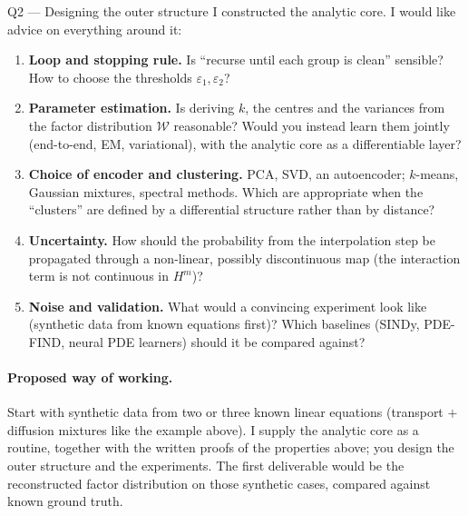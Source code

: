 \documentclass[11pt,a4paper]{article}
\begin{document}
\begin{askbox}{Q2 --- Designing the outer structure}
I constructed the analytic core. I would like advice on everything around it:
\begin{enumerate}[nosep,leftmargin=*]
\item \textbf{Loop and stopping rule.} Is ``recurse until each group is clean'' sensible? How to choose the thresholds $\varepsilon_1,\varepsilon_2$?
\item \textbf{Parameter estimation.} Is deriving $k$, the centres and the variances from the factor distribution $\mathcal W$ reasonable? Would you instead learn them jointly (end-to-end, EM, variational), with the analytic core as a differentiable layer?
\item \textbf{Choice of encoder and clustering.} PCA, SVD, an autoencoder; $k$-means, Gaussian mixtures, spectral methods. Which are appropriate when the ``clusters'' are defined by a differential structure rather than by distance?
\item \textbf{Uncertainty.} How should the probability from the interpolation step be propagated through a non-linear, possibly discontinuous map (the interaction term is not continuous in $H^m$)?
\item \textbf{Noise and validation.} What would a convincing experiment look like (synthetic data from known equations first)? Which baselines (SINDy, PDE-FIND, neural PDE learners) should it be compared against?
\end{enumerate}
\end{askbox}

\paragraph{Proposed way of working.}
Start with synthetic data from two or three known linear equations (transport $+$ diffusion mixtures like the example above). I supply the analytic core as a routine, together with the written proofs of the properties above; you design the outer structure and the experiments. The first deliverable would be the reconstructed factor distribution on those synthetic cases, compared against known ground truth.
\end{document}
